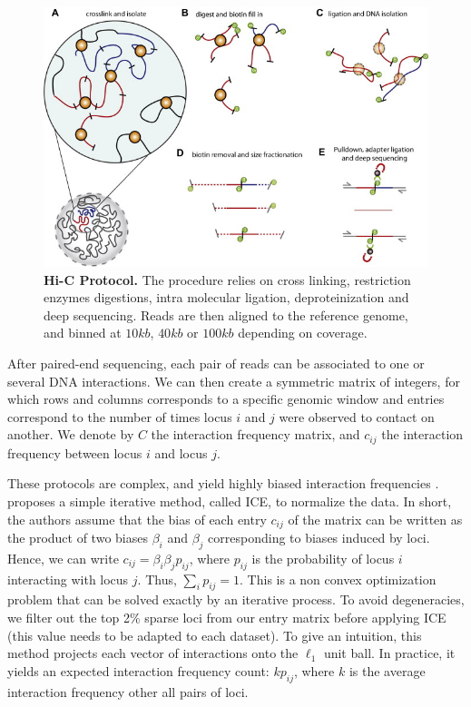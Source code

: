 \begin{figure}
\begin{center}
\includegraphics[width=0.8\linewidth]{figures/hic_protocol.png}
\end{center}
\caption{\textbf{Hi-C Protocol.} The procedure relies on cross linking,
restriction enzymes digestions, intra molecular ligation, deproteinization and
deep sequencing. Reads are then aligned to the reference genome, and binned at
$10kb$, $40kb$ or $100kb$ depending on coverage.}
\label{fig:protocol}
\end{figure}


After paired-end sequencing, each pair of reads can be associated to one
\citep{lieberman-aiden:comprehensive} or several \citep{ay:identifying} DNA
interactions. We can then create a symmetric matrix of integers, for which
rows and columns corresponds to a specific genomic window and entries
correspond to the number of times locus $i$ and $j$ were observed to contact
on another. We denote by
$C$ the interaction frequency matrix, and $c_{ij}$ the interaction frequency
between locus $i$ and locus $j$.

These protocols are complex, and yield highly biased interaction frequencies
\citep{imakaev:iterative, cournac:normalization, yaffe:probabilistic}.
\citet{imakaev:iterative} proposes a simple iterative method, called ICE, to
normalize the data. In short, the authors assume that the bias of each entry
$c_{ij}$ of the matrix can be written as the product of two biases $\beta_i$
and $\beta_j$ corresponding to biases induced by loci. Hence, we can write
$c_{ij} = \beta_i \beta_j p_{ij}$, where $p_{ij}$ is the probability of locus
$i$ interacting with locus $j$. Thus, $\sum_i p_{ij} = 1$. This is a non
convex optimization problem that can be solved exactly by an iterative
process. To avoid degeneracies, we filter out the top 2\% sparse loci from our
entry matrix before applying ICE (this value needs to be adapted to each
dataset). To give an intuition, this method projects each vector of
interactions onto the $\ell_1$ unit ball. In practice, it yields an expected
interaction frequency count: $k p_{ij}$, where $k$ is the average interaction
frequency other all pairs of loci.

